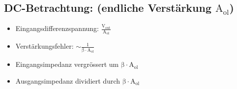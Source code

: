 \subsection{DC-Betrachtung: (endliche Verstärkung $\mathrm{A_{ol}}$)}
\begin{itemize}
    \item Eingangsdifferenzspannung: $\mathrm{\frac{V_{out}}{A_{ol}}}$
    \item Verstärkungsfehler: $\mathrm{\sim\frac{1}{\beta \cdot A_{ol}}}$
    \item Eingangsimpedanz vergrössert um $\mathrm{\beta \cdot A_{ol}}$
    \item Ausgangsimpedanz dividiert durch $\mathrm{\beta \cdot A_{ol}}$
  \end{itemize}  
